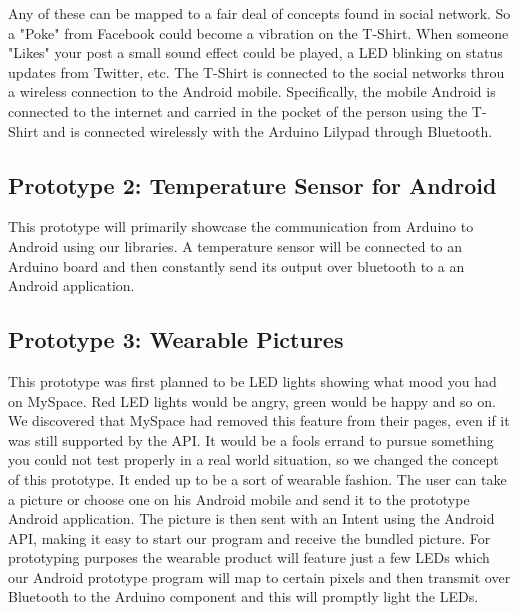 Any of these can be mapped to a fair deal of concepts found in social network.
So a "Poke" from Facebook could become a vibration on the T-Shirt. When someone "Likes" your post a small sound effect
could be played, a LED blinking on status updates from Twitter, etc. The T-Shirt is connected to the social networks
throu a wireless connection to the Android mobile. Specifically, the mobile Android is connected to the internet
and carried in the pocket of the person using the T-Shirt and is connected wirelessly with the Arduino Lilypad through Bluetooth.
	

\newpage
	
\subsection{Prototype 2: Temperature Sensor for Android}
This prototype will primarily showcase the communication from Arduino to Android using our libraries.
A temperature sensor will be connected to an Arduino board and then constantly send its output over bluetooth to a
an Android application.
	
\subsection{Prototype 3: Wearable Pictures}
This prototype was first planned to be LED lights showing what mood you had on MySpace. Red LED lights would be angry,
green would be happy and so on. We discovered that MySpace had removed this feature from their pages, even if it was
still supported by the API. It would be a fools errand to pursue something you could not test properly
in a real world situation, so we changed the concept of this prototype. It ended up to be a sort of wearable fashion.
The user can take a picture or choose one on his Android mobile and send it to the prototype Android application.
The picture is then sent with an Intent using the Android API, making it easy to start our program and receive
the bundled picture. For prototyping purposes the wearable product will feature just a few LEDs which our Android
prototype program will map to certain pixels and then transmit over Bluetooth to the Arduino
component and this will promptly light the LEDs.


